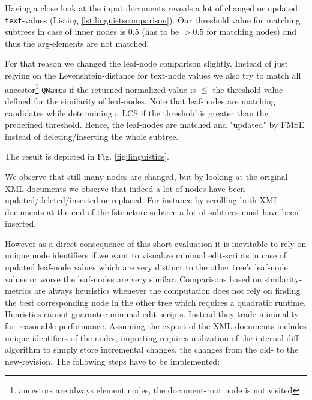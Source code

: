 Having a close look at the input documents reveals a lot of changed or updated \texttt{text}-values (Listing \ref{lst:linguistscomparison}). Our threshold value for matching subtrees in case of inner nodes is $0.5$ (has to be $> 0.5$ for matching nodes) and thus the arg-elements are not matched.

For that reason we changed the leaf-node comparison slightly. Instead of just relying on the Levenshtein-distance for text-node values we also try to match all ancestor\footnote{ancestors are always element nodes, the document-root node is not visited} \texttt{QName}s if the returned normalized value is $\leq$ the threshold value defined for the similarity of leaf-nodes. Note that leaf-nodes are matching candidates while determining a LCS if the threshold is greater than the predefined threshold. Hence, the leaf-nodes are matched and "updated" by FMSE instead of deleting/inserting the whole subtree.

The result is depicted in Fig. \ref{fig:linguistics}.

We observe that still many nodes are changed, but by looking at the original XML-documents we observe that indeed a lot of nodes have been updated/deleted/inserted or replaced. For instance by scrolling both XML-documents at the end of the fstructure-subtree a lot of subtrees must have been inserted.

However as a direct consequence of this short evaluation it is inevitable to rely on unique node identifiers if we want to visualize minimal edit-scripts in case of updated leaf-node values which are very distinct to the other tree's leaf-node values or worse the leaf-nodes are very similar. Comparisons based on similarity-metrics are always heuristics whenever the computation does not rely on finding the best corresponding node in the other tree which requires a quadratic runtime. Heuristics cannot guarantee minimal edit scripts. Instead they trade minimality for reasonable performance. Assuming the export of the XML-documents includes unique identifiers of the nodes, importing requires utilization of the internal diff-algorithm to simply store incremental changes, the changes from the old- to the new-revision. The following steps have to be implemented:


